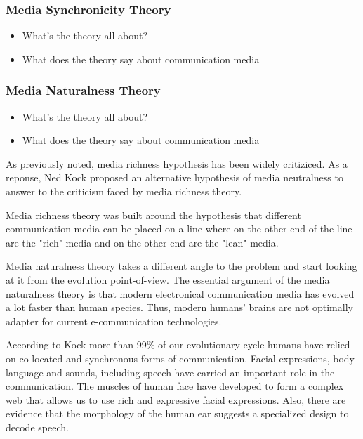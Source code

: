 \documentclass[english,12pt,a4paper,pdftex]{article}
\begin{document}
\subsubsection{Media Synchronicity Theory}

\begin{itemize}
\item What's the theory all about?
\item What does the theory say about communication media
\end{itemize}

\subsubsection{Media Naturalness Theory}

\begin{itemize}
\item What's the theory all about?
\item What does the theory say about communication media
\end{itemize}

As previously noted, media richness hypothesis has been widely critiziced. As a reponse, Ned Kock proposed an alternative hypothesis of media neutralness to answer to the criticism faced by media richness theory.

Media richness theory was built around the hypothesis that different communication media can be placed on a line where on the other end of the line are the "rich" media and on the other end are the "lean" media. \citep{daft1986}

Media naturalness theory takes a different angle to the problem and start looking at it from the evolution point-of-view. The essential argument of the media naturalness theory is that modern electronical communication media has evolved a lot faster than human species. Thus, modern humans' brains are not optimally adapter for current e-communication technologies. \citep{kock2005}

According to Kock more than 99\% of our evolutionary cycle humans have relied on co-located and synchronous forms of communication. Facial expressions, body language and sounds, including speech have carried an important role in the communication. The muscles of human face have developed to form a complex web that allows us to use rich and expressive facial expressions. Also, there are evidence that the morphology of the human ear suggests a specialized design to decode speech. \citep{kock2005}
\end{document}

